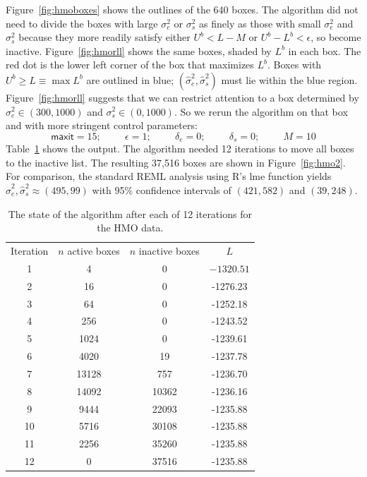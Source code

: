 \documentclass{report}
\newcommand{\textcompute}{\textsf}
\newcommand{\R}{\textcompute{R}\xspace}
\newcommand{\sigssq}{\sigma_s^2}
\newcommand{\sigesq}{\sigma_e^2}
\newcommand{\sshat}{\hat\sigma^2_e,\hat\sigma^2_s}
\newcommand{\maxit}{\textcompute{maxit}}
\begin{document}
Figure~\ref{fig:hmoboxes} shows the outlines of the 640 boxes.  The algorithm did not need to divide the boxes with large $\sigesq$ or $\sigssq$ as finely as those with small $\sigesq$ and $\sigssq$ because they more readily satisfy either $U^b < L-M$ or $U^b - L^b < \epsilon$, so become inactive.  Figure~\ref{fig:hmorll} shows the same boxes, shaded by $L^b$ in each box.  The red dot is the lower left corner of the box that maximizes $L^b$.  Boxes with $U^b \ge L \equiv \max L^b$ are outlined in blue; $(\sshat)$ must lie within the blue region.  
Figure~\ref{fig:hmorll}  suggests that we can restrict attention to a box determined by $\sigesq\in(300,1000)$ and $\sigssq\in(0,1000)$.  So we rerun the algorithm on that box and with more stringent control parameters:
\begin{equation*}
	\maxit=15; \hspace{1cm} \epsilon=1; \hspace{1cm}
	\delta_e=0; \hspace{1cm} \delta_s=0; \hspace{1cm} M=10
\end{equation*}
Table~\ref{table:hmo_HH11_run2} shows the output.  The algorithm needed 12 iterations to move all boxes to the inactive list.  The resulting 37,516 boxes are shown in Figure~\ref{fig:hmo2}.  For comparison, the standard REML analysis using \R's \textcompute{lme} function yields $\sshat \approx (495, 99)$ with 95\% confidence intervals of $(421, 582)$ and $(39, 248)$.

\begin{table}[h]
\centering
\begin{tabular}{|c|c|c|c|}
\hline
Iteration & $n$ active boxes & $n$ inactive boxes & $L$\\
1 & 4 & 0 & $-1320.51$\\
2 & 16 & 0 & -1276.23\\
3 & 64 & 0 & -1252.18\\
4 & 256 & 0 & -1243.52\\
5 & 1024 & 0 & -1239.61\\
6 & 4020 & 19 & -1237.78\\
7 & 13128 & 757 & -1236.70\\
8 & 14092 & 10362 & -1236.16\\
9 & 9444 & 22093 & -1235.88\\
10 & 5716 & 30108 & -1235.88\\
11 & 2256 & 35260 & -1235.88\\
12 & 0 & 37516 & -1235.88\\
\hline
\end{tabular}
\caption{The state of the algorithm after each of 12 iterations for the HMO data.}
\label{table:hmo_HH11_run2}
\end{table}
\end{document}
